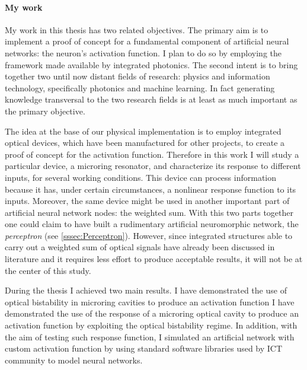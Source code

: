 \paragraph{My work\\}
My work in this thesis has two related objectives.
The primary aim is to implement a proof of concept for a fundamental component of artificial neural networks: the neuron's activation function.
I plan to do so by employing the framework made available by integrated photonics.
The second intent is to bring together two until now distant fields of research: physics and information technology, specifically photonics and machine learning.
In fact generating knowledge transversal to the two research fields is at least as much important as the primary objective.

The idea at the base of our physical implementation is to employ integrated optical devices, which have been manufactured for other projects, to create a proof of concept for the activation function.
Therefore in this work I will study a particular device, a microring resonator, and characterize its response to different inputs, for several working conditions.
This device can process information because it has, under certain circumstances, a nonlinear response function to its inputs.
Moreover, the same device might be used in another important part of artificial neural network nodes: the weighted sum.
With this two parts together one could claim to have built a rudimentary artificial neuromorphic network, the \textit{perceptron} (see \ref{sssec:Perceptron}).
However, since integrated structures able to carry out a weighted sum of optical signals have already been discussed in literature and it requires less effort to produce acceptable results, it will not be at the center of this study.

During the thesis I achieved two main results.
I have demonstrated the use of optical bistability in microring cavities to produce an activation function
I have demonstrated the use of the response of a microring optical cavity to produce an activation function by exploiting the optical bistability regime.
In addition, with the aim of testing such response function, I simulated an artificial network with custom activation function by using standard software libraries used by ICT community to model neural networks.

